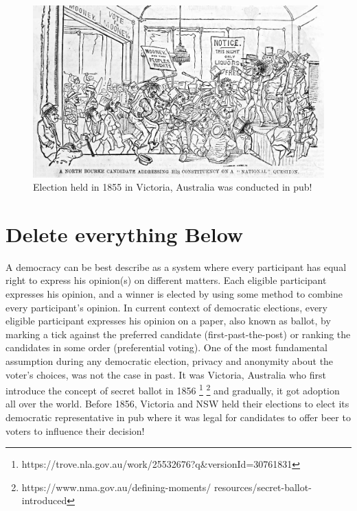 	   \begin{figure}[htb]
	\begin{center}
	\includegraphics[scale=0.25]{NorthBourke.jpg}
	\caption{Election held in 1855 in Victoria, Australia 
	  was conducted in pub!}
	\end{center}
  \end{figure}   
  
  





\section{Delete everything Below}


A democracy can be best describe as a system where every participant 
has equal right to express his opinion(s) on different matters. Each
eligible participant expresses his opinion, and a winner is elected 
by using some method to combine every participant's opinion.
In current context of democratic elections, 
every eligible participant expresses his opinion on a paper, also 
known as ballot, 
by marking a tick against the preferred candidate 
(first-past-the-post) or ranking the candidates in some order
(preferential voting). 
One of the most fundamental assumption during any democratic 
election, privacy and anonymity about the voter's choices, was not the case 
in past. It was Victoria, Australia who first introduce the 
concept of secret ballot in 1856 \footnote{
 https://trove.nla.gov.au/work/25532676?q\&versionId=30761831}
 \footnote{https://www.nma.gov.au/defining-moments/
	  resources/secret-ballot-introduced} and gradually, it 
	  got adoption all over the world. Before 1856, Victoria
	  and NSW held their elections to elect its 
	  democratic representative in pub where it was legal for 
	  candidates to offer beer to voters to influence their 
	  decision! 
	  
